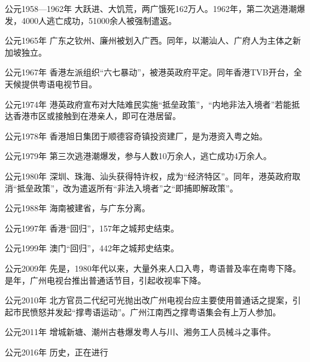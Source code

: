 公元1958—1962年 大跃进、大饥荒，两广饿死162万人。1962年，第二次逃港潮爆发，4000人逃亡成功，51000余人被强制遣返。

公元1965年 广东之钦州、廉州被划入广西。同年，以潮汕人、广府人为主体之新加坡独立。

公元1967年 香港左派组织“六七暴动”，被港英政府平定。同年香港TVB开台，全天候提供粤语电视节目。

公元1974年 港英政府宣布对大陆难民实施“抵垒政策”，“内地非法入境者”若能抵达香港市区或接触到在港亲人，即可在港居留。

公元1978年 香港旭日集团于顺德容奇镇投资建厂，是为港资入粤之始。

公元1979年 第三次逃港潮爆发，参与人数10万余人，逃亡成功4万余人。

公元1980年 深圳、珠海、汕头获得特许权，成为“经济特区”。同年，港英政府取消“抵垒政策”，改为遣返所有“非法入境者”之“即捕即解政策”。

公元1988年 海南被建省，与广东分离。

公元1997年 香港“回归”，157年之城邦史结束。

公元1999年 澳门“回归”，442年之城邦史结束。

公元2009年 先是，1980年代以来，大量外来人口入粤，粤语普及率在南粤下降。是年，广州电视台推出普通话节目，引起收视率下降。

公元2010年 北方官员二代纪可光抛出改广州电视台应主要使用普通话之提案，引起市民愤怒并发起“撑粤语运动”。广州江南西之撑粤语集会有上万人参加。

公元2011年 增城新塘、潮州古巷爆发粤人与川、湘务工人员械斗之事件。

公元2016年 历史，正在进行
